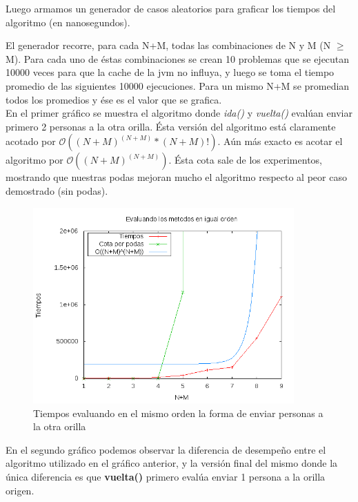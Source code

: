 \vspace*{5mm}
Luego armamos un generador de casos aleatorios para graficar los tiempos del algoritmo (en nanosegundos).

El generador recorre, para cada N+M, todas las combinaciones de N y M (N $\geq$ M). Para cada uno de éstas combinaciones se crean 10 problemas que se ejecutan 10000 veces para que la cache de la jvm no influya, y luego se toma el tiempo promedio de las siguientes 10000 ejecuciones. Para un mismo N+M se promedian todos los promedios y ése es el valor que se grafica.
\\

En el primer gráfico se muestra el algoritmo donde \textit{ida()} y \textit{vuelta()} evalúan enviar primero 2 personas a la otra orilla. Ésta versión del algoritmo está claramente acotado por $\mathcal{O}({(N+M)}^{(N+M)} * (N+M)!)$. Aún más exacto es acotar el algoritmo por $\mathcal{O}({(N+M)}^{(N+M)})$. \'Esta cota sale de los experimentos, mostrando que nuestras podas mejoran mucho el algoritmo respecto al peor caso demostrado (sin podas).


\begin{figure}[H]
    \centering
    \includegraphics[width=10cm]{./imagenes/tiemposEj1Igual.png}
    \caption{Tiempos evaluando en el mismo orden la forma de enviar personas a la otra orilla}
\end{figure}

\newpage

En el segundo gráfico podemos observar la diferencia de desempeño entre el algoritmo utilizado en el gráfico anterior, y la versión final del mismo donde la única diferencia es que \textbf{vuelta()} primero evalúa enviar 1 persona a la orilla origen.


